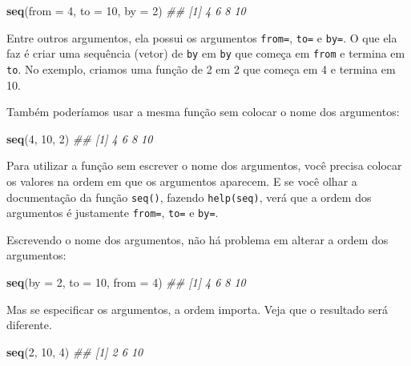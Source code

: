 \documentclass[]{book}
\newenvironment{Shaded}{\begin{snugshade}}{\end{snugshade}}
\newcommand{\CommentTok}[1]{\textcolor[rgb]{0.56,0.35,0.01}{\textit{#1}}}
\newcommand{\DataTypeTok}[1]{\textcolor[rgb]{0.13,0.29,0.53}{#1}}
\newcommand{\DecValTok}[1]{\textcolor[rgb]{0.00,0.00,0.81}{#1}}
\newcommand{\KeywordTok}[1]{\textcolor[rgb]{0.13,0.29,0.53}{\textbf{#1}}}
\newcommand{\NormalTok}[1]{#1}
\begin{document}
\begin{Shaded}
\begin{Highlighting}[]
\KeywordTok{seq}\NormalTok{(}\DataTypeTok{from =} \DecValTok{4}\NormalTok{, }\DataTypeTok{to =} \DecValTok{10}\NormalTok{, }\DataTypeTok{by =} \DecValTok{2}\NormalTok{)}
\CommentTok{## [1]  4  6  8 10}
\end{Highlighting}
\end{Shaded}

Entre outros argumentos, ela possui os argumentos \texttt{from=}, \texttt{to=} e \texttt{by=}. O que ela faz é criar uma sequência (vetor) de \texttt{by} em \texttt{by} que começa em \texttt{from} e termina em \texttt{to}. No exemplo, criamos uma função de 2 em 2 que começa em 4 e termina em 10.

Também poderíamos usar a mesma função sem colocar o nome dos argumentos:

\begin{Shaded}
\begin{Highlighting}[]
\KeywordTok{seq}\NormalTok{(}\DecValTok{4}\NormalTok{, }\DecValTok{10}\NormalTok{, }\DecValTok{2}\NormalTok{)}
\CommentTok{## [1]  4  6  8 10}
\end{Highlighting}
\end{Shaded}

Para utilizar a função sem escrever o nome dos argumentos, você precisa colocar os valores na ordem em que os argumentos aparecem. E se você olhar a documentação da função \texttt{seq()}, fazendo \texttt{help(seq)}, verá que a ordem dos argumentos é justamente \texttt{from=}, \texttt{to=} e \texttt{by=}.

Escrevendo o nome dos argumentos, não há problema em alterar a ordem dos argumentos:

\begin{Shaded}
\begin{Highlighting}[]
\KeywordTok{seq}\NormalTok{(}\DataTypeTok{by =} \DecValTok{2}\NormalTok{, }\DataTypeTok{to =} \DecValTok{10}\NormalTok{, }\DataTypeTok{from =} \DecValTok{4}\NormalTok{)}
\CommentTok{## [1]  4  6  8 10}
\end{Highlighting}
\end{Shaded}

Mas se especificar os argumentos, a ordem importa. Veja que o resultado será diferente.

\begin{Shaded}
\begin{Highlighting}[]
\KeywordTok{seq}\NormalTok{(}\DecValTok{2}\NormalTok{, }\DecValTok{10}\NormalTok{, }\DecValTok{4}\NormalTok{)}
\CommentTok{## [1]  2  6 10}
\end{Highlighting}
\end{Shaded}
\end{document}
